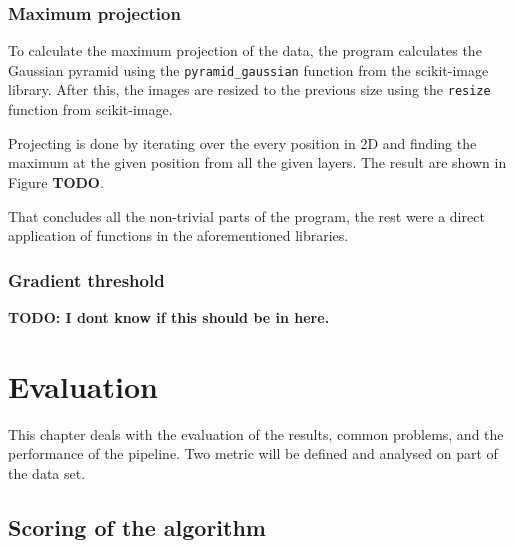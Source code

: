 \documentclass[
  digital,     %
  oneside,     %
  nosansbold,  %
  nocolorbold, %
  lof,         %
  lot,         %
]{fithesis4}
\begin{document}
\subsection{Maximum projection} To calculate the maximum projection of the data,
the program calculates the Gaussian pyramid using the \texttt{pyramid\_gaussian}
function from the scikit-image library. After this, the images are resized to
the previous size using the \texttt{resize} function from scikit-image.

Projecting is done by iterating over the every position in 2D and finding the
maximum at the given position from all the given layers. The result are shown in
Figure \textbf{TODO}.

That concludes all the non-trivial parts of the program, the rest were a direct
application of functions in the aforementioned libraries.

\subsection{Gradient threshold}
\textbf{TODO: I dont know if this should be in here.}

\chapter{Evaluation}
This chapter deals with the evaluation of the results, common problems, and the
performance of the pipeline. Two metric will be defined and analysed on part of
the data set.

\section{Scoring of the algorithm}
\end{document}

